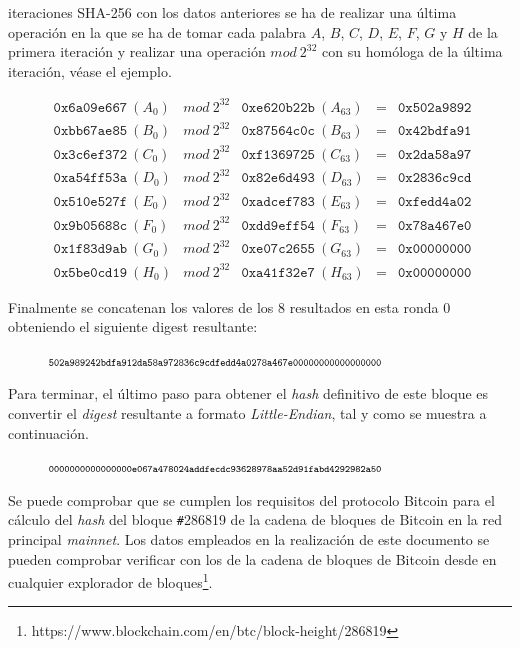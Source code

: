 \documentclass{article}
\begin{document}
    \vspace{1.3mm}
    
     iteraciones SHA-256 con los datos anteriores se ha de realizar una última operación en la que se ha de tomar cada palabra $A$, $B$, $C$, $D$, $E$, $F$, $G$ y $H$ de la primera iteración y realizar  una operación $mod\ 2^{32}$ con su homóloga de la última iteración, véase el ejemplo.
    
    \begin{figure}[H]
    \centering
        $\begin{array}{lllll}
            \texttt{0x6a09e667}\ (A_{0}) & mod\ 2^{32} & \texttt{0xe620b22b}\ (A_{63}) & = & \texttt{0x502a9892} \\
            \texttt{0xbb67ae85}\ (B_{0}) & mod\ 2^{32} & \texttt{0x87564c0c}\ (B_{63}) & = & \texttt{0x42bdfa91} \\
            \texttt{0x3c6ef372}\ (C_{0}) & mod\ 2^{32} & \texttt{0xf1369725}\ (C_{63}) & = & \texttt{0x2da58a97} \\
            \texttt{0xa54ff53a}\ (D_{0}) & mod\ 2^{32} & \texttt{0x82e6d493}\ (D_{63}) & = & \texttt{0x2836c9cd} \\
            \texttt{0x510e527f}\ (E_{0}) & mod\ 2^{32} & \texttt{0xadcef783}\ (E_{63}) & = & \texttt{0xfedd4a02} \\
            \texttt{0x9b05688c}\ (F_{0}) & mod\ 2^{32} & \texttt{0xdd9eff54}\ (F_{63}) & = & \texttt{0x78a467e0} \\
            \texttt{0x1f83d9ab}\ (G_{0}) & mod\ 2^{32} & \texttt{0xe07c2655}\ (G_{63}) & = & \texttt{0x00000000} \\
            \texttt{0x5be0cd19}\ (H_{0}) & mod\ 2^{32} & \texttt{0xa41f32e7}\ (H_{63}) & = & \texttt{0x00000000}
        \end{array}$
    \end{figure}
    
    Finalmente se concatenan los valores de los 8 resultados en esta ronda 0 obteniendo el siguiente digest resultante:
    
    \begin{figure}[H]
    \centering
        $\scriptsize{\texttt{502a989242bdfa912da58a972836c9cdfedd4a0278a467e00000000000000000}}$
    \end{figure}
    Para terminar, el último paso para obtener el \textit{hash} definitivo de este bloque es convertir el \textit{digest} resultante a formato \textit{Little-Endian}, tal y como se muestra a continuación.
    \begin{figure}[H]
    \centering
        $\scriptsize{\texttt{0000000000000000e067a478024addfecdc93628978aa52d91fabd4292982a50}}$
    \end{figure}
    Se puede comprobar que se cumplen los requisitos del protocolo Bitcoin para el cálculo del \textit{hash} del bloque \texttt{\#}286819 de la cadena de bloques de Bitcoin en la red principal \textit{mainnet}. Los datos empleados en la realización de este documento se pueden comprobar verificar con los de la cadena de bloques de Bitcoin desde en cualquier explorador de bloques\footnote{https://www.blockchain.com/en/btc/block-height/286819}.
\end{document}
